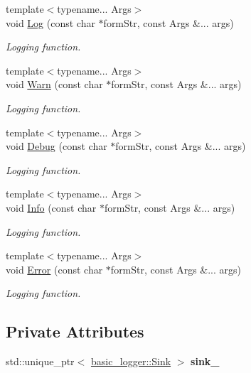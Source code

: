 \begin{DoxyCompactItemize}
\item 
{\footnotesize template$<$typename... Args$>$ }\\void \hyperlink{classcof_1_1basic__logger_1_1_logger_a4c698d87cddfe754221f7657caa2b06a}{Log} (const char $\ast$form\+Str, const Args \&... args)
\begin{DoxyCompactList}\small\item\em Logging function. \end{DoxyCompactList}\item 
{\footnotesize template$<$typename... Args$>$ }\\void \hyperlink{classcof_1_1basic__logger_1_1_logger_ad518be9654acd1d698c6a8eb50262d52}{Warn} (const char $\ast$form\+Str, const Args \&... args)
\begin{DoxyCompactList}\small\item\em Logging function. \end{DoxyCompactList}\item 
{\footnotesize template$<$typename... Args$>$ }\\void \hyperlink{classcof_1_1basic__logger_1_1_logger_a4562cce09bb747a47ce052f5388b16b6}{Debug} (const char $\ast$form\+Str, const Args \&... args)
\begin{DoxyCompactList}\small\item\em Logging function. \end{DoxyCompactList}\item 
{\footnotesize template$<$typename... Args$>$ }\\void \hyperlink{classcof_1_1basic__logger_1_1_logger_a9a280522d90572bed5d06f7540d42522}{Info} (const char $\ast$form\+Str, const Args \&... args)
\begin{DoxyCompactList}\small\item\em Logging function. \end{DoxyCompactList}\item 
{\footnotesize template$<$typename... Args$>$ }\\void \hyperlink{classcof_1_1basic__logger_1_1_logger_a6de6aa4607ebb5edf8d3732f214f41f1}{Error} (const char $\ast$form\+Str, const Args \&... args)
\begin{DoxyCompactList}\small\item\em Logging function. \end{DoxyCompactList}\end{DoxyCompactItemize}
\subsection*{Private Attributes}
\begin{DoxyCompactItemize}
\item 
\mbox{\label{classcof_1_1basic__logger_1_1_logger_a7972063db1d84fe2a5fb3e5fde1ad997}} 
std\+::unique\+\_\+ptr$<$ \hyperlink{classcof_1_1basic__logger_1_1_sink}{basic\+\_\+logger\+::\+Sink} $>$ {\bfseries sink\+\_\+}
\end{DoxyCompactItemize}


